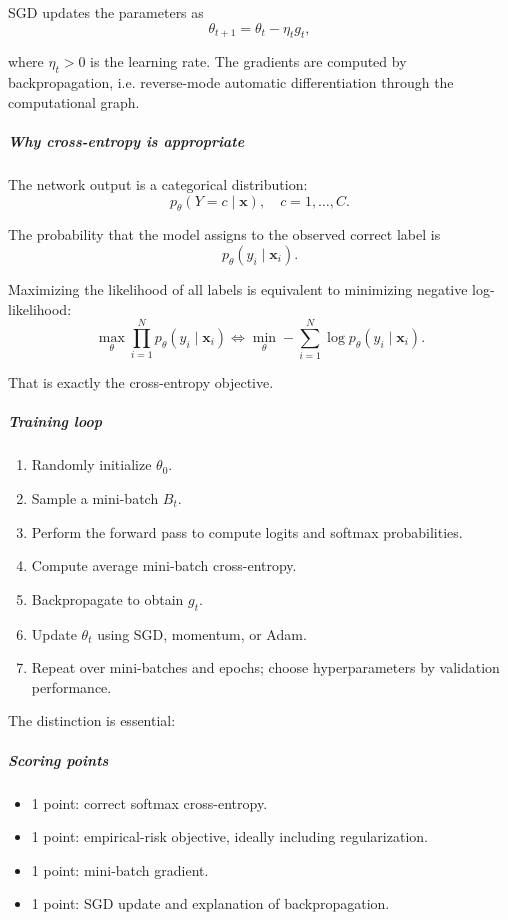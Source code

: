 \documentclass[11pt,a4paper]{article}
\theoremstyle{definition}
\begin{document}
SGD updates the parameters as
\[
\boxed{\theta_{t+1} = \theta_t - \eta_t g_t,}
\]

where $\eta_t > 0$ is the learning rate. The gradients are computed by backpropagation, i.e. reverse-mode automatic differentiation through the computational graph.

\subparagraph{Why cross-entropy is appropriate}

The network output is a categorical distribution:
\[
p_\theta(Y = c \mid \boldsymbol{x}), \quad c = 1, \dots, C.
\]

The probability that the model assigns to the observed correct label is
\[
p_\theta(y_i \mid \boldsymbol{x}_i).
\]

Maximizing the likelihood of all labels is equivalent to minimizing negative log-likelihood:
\[
\max_\theta \prod_{i=1}^N p_\theta(y_i \mid \boldsymbol{x}_i) \iff \min_\theta -\sum_{i=1}^N \log p_\theta(y_i \mid \boldsymbol{x}_i).
\]

That is exactly the cross-entropy objective.


\subparagraph{Training loop}
\begin{enumerate}
    \item Randomly initialize $\theta_0$.
    \item Sample a mini-batch $B_t$.
    \item Perform the forward pass to compute logits and softmax probabilities.
    \item Compute average mini-batch cross-entropy.
    \item Backpropagate to obtain $g_t$.
    \item Update $\theta_t$ using SGD, momentum, or Adam.
    \item Repeat over mini-batches and epochs; choose hyperparameters by validation performance.
\end{enumerate}

The distinction is essential:

\begin{center}
\end{center}

\subparagraph{Scoring points}
\begin{itemize}
    \item 1 point: correct softmax cross-entropy.
    \item 1 point: empirical-risk objective, ideally including regularization.
    \item 1 point: mini-batch gradient.
    \item 1 point: SGD update and explanation of backpropagation.
\end{itemize}
\end{document}

